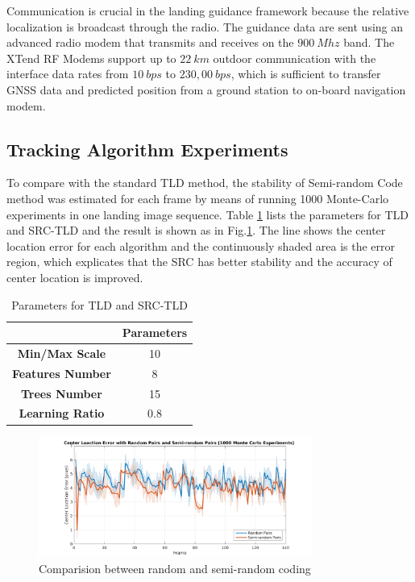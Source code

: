 Communication is crucial in the landing guidance framework because the relative localization is broadcast through the radio. The guidance data are sent using an advanced radio modem that transmits and receives on the $900\ Mhz$ band. The XTend RF Modems support up to $22\ km$ outdoor communication with the interface data rates from $10\ bps$ to $230,00\ bps$, which is sufficient to transfer GNSS data and predicted position from a ground station to on-board navigation modem. 




\subsection{Tracking Algorithm Experiments}
To compare with the standard TLD method, the stability of Semi-random Code method was estimated for each frame by means of running 1000 Monte-Carlo experiments in one landing image sequence. Table \ref{lab:TLD_params} lists the parameters for TLD and SRC-TLD and the result is shown as in Fig.\ref{fig:chp04_24_random_semi_random_monte_carlo}. The line shows the center location error for each algorithm and the continuously shaded area is the error region, which explicates that the SRC has better stability and the accuracy of center location is improved. 

\begin{table}[!th]
	\centering
	\caption{Parameters for TLD and SRC-TLD}
	\label{lab:TLD_params}
	\begin{tabular}{cc}
		\hline
		& \textbf{Parameters} \\ \hline
		\textbf{Min/Max Scale} & 10 \\
		\textbf{Features Number} & 8 \\
		\textbf{Trees Number} & 15 \\
		\textbf{Learning Ratio} & 0.8 \\ \hline
	\end{tabular}
\end{table}

\begin{figure}[!th]
	\centering
	\includegraphics[width=0.8\textwidth]{Figs/chp04_24_random_semi_random_monte_carlo.pdf}
	\caption{Comparision between random and semi-random coding}
	\label{fig:chp04_24_random_semi_random_monte_carlo}    
\end{figure}

